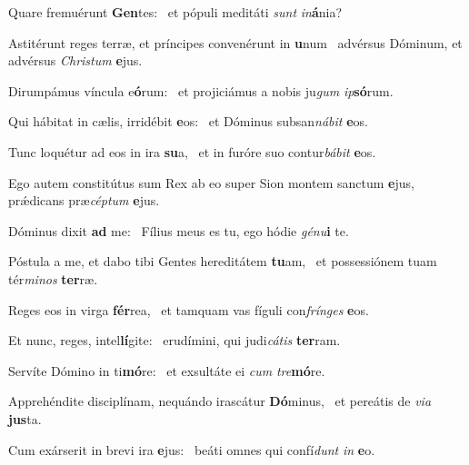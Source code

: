 \item Quare fremuérunt \textbf{Gen}tes:~\psstar{} et pópuli meditáti \textit{sunt} \textit{in}\textbf{á}nia?
\item Astitérunt reges terræ, et príncipes convenérunt in \textbf{u}num~\psstar{} advérsus Dóminum, et advérsus \textit{Chris}\textit{tum} \textbf{e}jus.
\item Dirumpámus víncula e\textbf{ó}rum:~\psstar{} et projiciámus a nobis ju\textit{gum} \textit{ip}\textbf{só}rum.
\item Qui hábitat in cælis, irridébit \textbf{e}os:~\psstar{} et Dóminus subsan\textit{ná}\textit{bit} \textbf{e}os.
\item Tunc loquétur ad eos in ira \textbf{su}a,~\psstar{} et in furóre suo contur\textit{bá}\textit{bit} \textbf{e}os.
\item Ego autem constitútus sum Rex ab eo super Sion montem sanctum \textbf{e}jus,~\psstar{} prǽdicans præ\textit{cép}\textit{tum} \textbf{e}jus.
\item Dóminus dixit \textbf{ad} me:~\psstar{} Fílius meus es tu, ego hódie \textit{gé}\textit{nu}\textbf{i} te.
\item Póstula a me, et dabo tibi Gentes hereditátem \textbf{tu}am,~\psstar{} et possessiónem tuam tér\textit{mi}\textit{nos} \textbf{ter}ræ.
\item Reges eos in virga \textbf{fér}rea,~\psstar{} et tamquam vas fíguli con\textit{frín}\textit{ges} \textbf{e}os.
\item Et nunc, reges, intel\textbf{lí}gite:~\psstar{} erudímini, qui judi\textit{cá}\textit{tis} \textbf{ter}ram.
\item Servíte Dómino in ti\textbf{mó}re:~\psstar{} et exsultáte ei \textit{cum} \textit{tre}\textbf{mó}re.
\item Apprehéndite disciplínam, nequándo irascátur \textbf{Dó}minus,~\psstar{} et pereátis de \textit{vi}\textit{a} \textbf{jus}ta.
\item Cum exárserit in brevi ira \textbf{e}jus:~\psstar{} beáti omnes qui confí\textit{dunt} \textit{in} \textbf{e}o.
